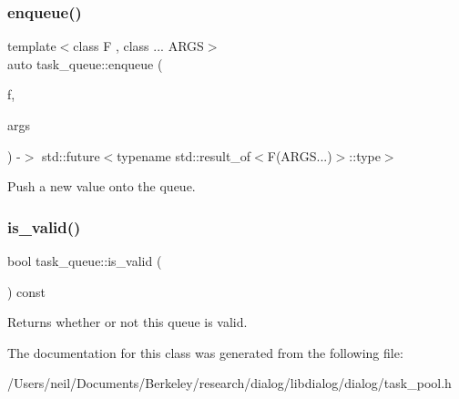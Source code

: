 \subsubsection{\texorpdfstring{enqueue()}{enqueue()}}
{\footnotesize\ttfamily template$<$class F , class ... A\+R\+GS$>$ \\
auto task\+\_\+queue\+::enqueue (\begin{DoxyParamCaption}\item[{F \&\&}]{f,  }\item[{A\+R\+GS \&\&...}]{args }\end{DoxyParamCaption}) -\/$>$ std\+::future$<$typename std\+::result\+\_\+of$<$F(A\+R\+G\+S...)$>$\+::type$>$ \hspace{0.3cm}{\ttfamily [inline]}}

Push a new value onto the queue. \mbox{\label{classtask__queue_a75e723aa9cc68a264d63b40b3ef3f280}} 
\subsubsection{\texorpdfstring{is\+\_\+valid()}{is\_valid()}}
{\footnotesize\ttfamily bool task\+\_\+queue\+::is\+\_\+valid (\begin{DoxyParamCaption}{ }\end{DoxyParamCaption}) const\hspace{0.3cm}{\ttfamily [inline]}}

Returns whether or not this queue is valid. 

The documentation for this class was generated from the following file\+:\begin{DoxyCompactItemize}
\item 
/\+Users/neil/\+Documents/\+Berkeley/research/dialog/libdialog/dialog/task\+\_\+pool.\+h\end{DoxyCompactItemize}
